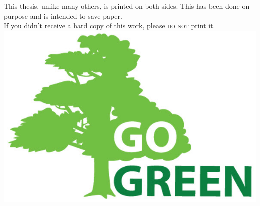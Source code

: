\thispagestyle{empty}
{}

\vspace*{4cm}

\medskip

\begin{center}
    This thesis, unlike many others, is printed on both sides. This has been done on purpose and is intended to save paper. \\ \bigskip
    \bigskip
    If you didn't receive a hard copy of this work, please \textsc{do not} print it.\\ \bigskip \bigskip
    \includegraphics[width=.45\linewidth]{gfx/gogreen}
\end{center}